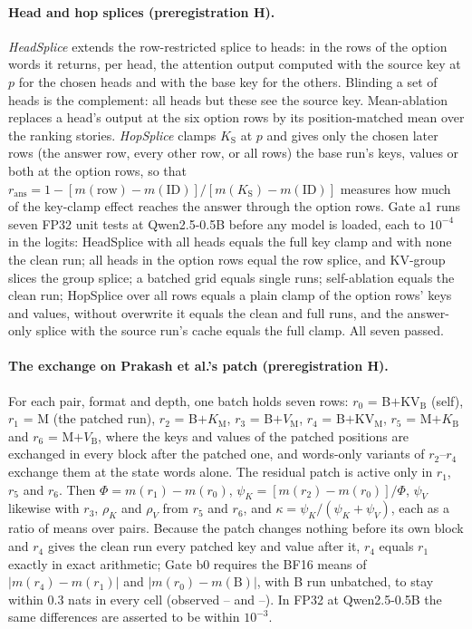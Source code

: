 \paragraph{Head and hop splices (preregistration H).} \emph{HeadSplice} extends the row-restricted splice to heads: in the rows of the option words it returns, per head, the attention output computed with the source key at $p$ for the chosen heads and with the base key for the others. Blinding a set of heads is the complement: all heads but these see the source key. Mean-ablation replaces a head's output at the six option rows by its position-matched mean over the ranking stories. \emph{HopSplice} clamps $K_{\mathrm{S}}$ at $p$ and gives only the chosen later rows (the answer row, every other row, or all rows) the base run's keys, values or both at the option rows, so that $r_{\mathrm{ans}} = 1 - [m(\text{row}) - m(\mathrm{ID})]/[m(K_{\mathrm{S}}) - m(\mathrm{ID})]$ measures how much of the key-clamp effect reaches the answer through the option rows. Gate a1 runs seven FP32 unit tests at Qwen2.5-0.5B before any model is loaded, each to $10^{-4}$ in the logits: HeadSplice with all heads equals the full key clamp and with none the clean run; all heads in the option rows equal the row splice, and KV-group slices the group splice; a batched grid equals single runs; self-ablation equals the clean run; HopSplice over all rows equals a plain clamp of the option rows' keys and values, without overwrite it equals the clean and full runs, and the answer-only splice with the source run's cache equals the full clamp. All seven passed.

\paragraph{The exchange on Prakash et al.'s patch (preregistration H).} For each pair, format and depth, one batch holds seven rows: $r_0$ = B$+$KV$_{\mathrm{B}}$ (self), $r_1$ = M (the patched run), $r_2$ = B$+K_{\mathrm{M}}$, $r_3$ = B$+V_{\mathrm{M}}$, $r_4$ = B$+$KV$_{\mathrm{M}}$, $r_5$ = M$+K_{\mathrm{B}}$ and $r_6$ = M$+V_{\mathrm{B}}$, where the keys and values of the patched positions are exchanged in every block after the patched one, and words-only variants of $r_2$--$r_4$ exchange them at the state words alone. The residual patch is active only in $r_1$, $r_5$ and $r_6$. Then $\Phi = m(r_1) - m(r_0)$, $\psi_K = [m(r_2) - m(r_0)]/\Phi$, $\psi_V$ likewise with $r_3$, $\rho_K$ and $\rho_V$ from $r_5$ and $r_6$, and $\kappa = \psi_K/(\psi_K + \psi_V)$, each as a ratio of means over pairs. Because the patch changes nothing before its own block and $r_4$ gives the clean run every patched key and value after it, $r_4$ equals $r_1$ exactly in exact arithmetic; Gate b0 requires the BF16 means of $\lvert m(r_4) - m(r_1)\rvert$ and $\lvert m(r_0) - m(\mathrm{B})\rvert$, with B run unbatched, to stay within 0.3 nats in every cell (observed \PkBzeroAMin{}--\PkBzeroAMax{} and \PkBzeroBMin{}--\PkBzeroBMax{}). In FP32 at Qwen2.5-0.5B the same differences are asserted to be within $10^{-3}$.

